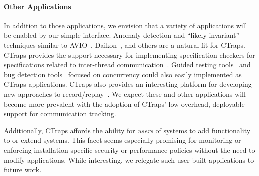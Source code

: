 \documentclass[preprint,9pt]{sigplanconf}
\newcommand{\ctraps}{CTraps\xspace}
\newcommand{\ctrapsfull}{CTraps-Full\xspace}
\newcommand{\ctrapsmm}{CTraps-NRR\xspace}
\newcommand{\lws}{CTraps-LWS\xspace}
\newcommand{\lwt}{LWT\xspace}
\begin{document}
\paragraph{Other Applications}
In addition to those applications, we envision that a variety of applications
will be enabled by our simple interface.  Anomaly detection and ``likely
invariant'' techniques similar to AVIO~\cite{avio}, Daikon~\cite{daikon}, and
others are a natural fit for \ctraps.  \ctraps provides the support necessary
for implementing specification checkers for specifications related to
inter-thread communication~\cite{velodrome,oshajava}.  Guided testing
tools~\cite{cuzz,chess} and bug detection tools~\cite{ctrigger} focused on
concurrency could also easily implemented as \ctraps applications.  \ctraps
also provides an interesting platform for developing new approaches to
record/replay~\cite{chimera,fdr}.  We expect these and other
applications will become more prevalent with the adoption of \ctraps'
low-overhead, deployable support for communication tracking.

Additionally, \ctraps affords the ability for {\em users} of systems to add
functionality to or extend systems.  This facet seems especially promising for
monitoring or enforcing installation-specific security or performance policies
without the need to modify applications.  While interesting, we relegate such
user-built applications to future work.



%




\end{document}
